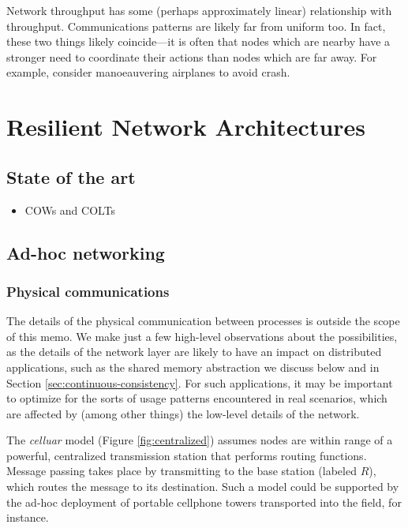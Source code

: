\documentclass[]             %
{NASA}                       %
\theoremstyle{definition}
\providecommand{\tightlist}{%
  \setlength{\itemsep}{0pt}\setlength{\parskip}{0pt}}
\begin{document}
Network throughput has some (perhaps approximately linear) relationship
with throughput. Communications patterns are likely far from uniform
too. In fact, these two things likely coincide---it is often that nodes
which are nearby have a stronger need to coordinate their actions than
nodes which are far away. For example, consider manoeauvering airplanes
to avoid crash.

\newpage

\hypertarget{resilient-network-architectures}{%
\section{Resilient Network
Architectures}\label{resilient-network-architectures}}

\label{sec:networking}

\hypertarget{state-of-the-art}{%
\subsection{State of the art}\label{state-of-the-art}}

\begin{itemize}
\tightlist
\item
  COWs and COLTs
\end{itemize}

\hypertarget{ad-hoc-networking}{%
\subsection{Ad-hoc networking}\label{ad-hoc-networking}}

\hypertarget{physical-communications}{%
\subsubsection{Physical communications}\label{physical-communications}}

The details of the physical communication between processes is outside
the scope of this memo. We make just a few high-level observations about
the possibilities, as the details of the network layer are likely to
have an impact on distributed applications, such as the shared memory
abstraction we discuss below and in Section
\ref{sec:continuous-consistency}. For such applications, it may be
important to optimize for the sorts of usage patterns encountered in
real scenarios, which are affected by (among other things) the low-level
details of the network.

The \emph{celluar} model (Figure \ref{fig:centralized}) assumes nodes
are within range of a powerful, centralized transmission station that
performs routing functions. Message passing takes place by transmitting
to the base station (labeled \(R\)), which routes the message to its
destination. Such a model could be supported by the ad-hoc deployment of
portable cellphone towers transported into the field, for instance.
\end{document}
